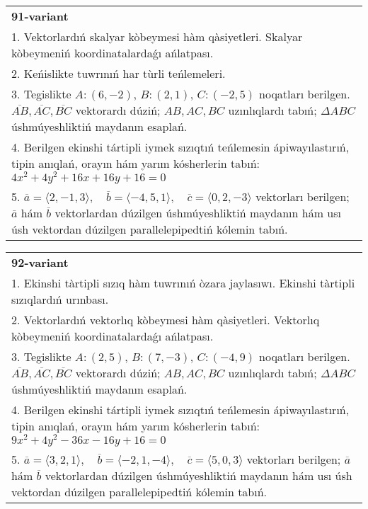 \documentclass{article}
\begin{document}
\begin{tabular}{m{17cm}}
\textbf{91-variant}\\
1. Vektorlardıń skalyar kòbeymesi hàm qàsiyetleri. Skalyar kòbeymeniń koordinatalardaǵı ańlatpası.\\

2. Keńislikte tuwrınıń har tùrli teńlemeleri. \\

3. Tegislikte $A: (6, -2)$, $B: (2, 1)$, $C: (-2, 5)$ noqatları berilgen. $\overline{AB}, \overline{AC}, \overline{BC}$ vektorardı dúziń; $AB, AC, BC$ uzınlıqlardı tabıń; $\Delta ABC$ úshmúyeshliktiń maydanın esaplań. \\

4. Berilgen ekinshi tártipli iymek sızıqtıń teńlemesin ápiwayılastırıń, tipin anıqlań, orayın hám yarım kósherlerin tabıń: $4x^2+4y^2+16x+16y+16=0$\\

5. \(\overline{a} = \langle 2, -1, 3 \rangle, \quad \overline{b} = \langle -4, 5, 1 \rangle, \quad \overline{c} = \langle 0, 2, -3 \rangle\) vektorları berilgen; \(\overline{a}\) hám \(\overline{b}\) vektorlardan dúzilgen úshmúyeshliktiń maydanın hám usı úsh vektordan dúzilgen parallelepipedtiń kólemin tabıń.
\end{tabular}
\vspace{1cm}


\begin{tabular}{m{17cm}}
\textbf{92-variant}\\
1. Ekinshi tàrtipli sızıq hàm tuwrınıń òzara jaylasıwı. Ekinshi tàrtipli sızıqlardıń urınbası.\\

2. Vektorlardıń vektorlıq kòbeymesi hàm qàsiyetleri. Vektorlıq kòbeymeniń koordinatalardaǵı ańlatpası. \\

3. Tegislikte $A: (2, 5)$, $B: (7, -3)$, $C: (-4, 9)$ noqatları berilgen. $\overline{AB}, \overline{AC}, \overline{BC}$ vektorardı dúziń; $AB, AC, BC$ uzınlıqlardı tabıń; $\Delta ABC$ úshmúyeshliktiń maydanın esaplań. \\

4. Berilgen ekinshi tártipli iymek sızıqtıń teńlemesin ápiwayılastırıń, tipin anıqlań, orayın hám yarım kósherlerin tabıń: $9x^2+4y^2-36x-16y+16=0$\\

5. \(\overline{a} = \langle 3, 2, 1 \rangle, \quad \overline{b} = \langle -2, 1, -4 \rangle, \quad \overline{c} = \langle 5, 0, 3 \rangle\) vektorları berilgen; \(\overline{a}\) hám \(\overline{b}\) vektorlardan dúzilgen úshmúyeshliktiń maydanın hám usı úsh vektordan dúzilgen parallelepipedtiń kólemin tabıń.
\end{tabular}
\vspace{1cm}
\end{document}
